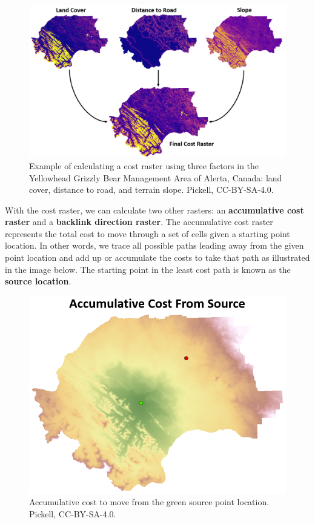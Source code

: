 \documentclass[
]{book}
\begin{document}
\begin{figure}
\includegraphics[width=0.75\linewidth]{images/08-calculating-cost-raster} \caption{Example of calculating a cost raster using three factors in the Yellowhead Grizzly Bear Management Area of Alerta, Canada: land cover, distance to road, and terrain slope. Pickell, CC-BY-SA-4.0.}\label{fig:8-calculating-cost-raster}
\end{figure}

With the cost raster, we can calculate two other rasters: an \textbf{accumulative cost raster} and a \textbf{backlink direction raster}. The accumulative cost raster represents the total cost to move through a set of cells given a starting point location. In other words, we trace all possible paths leading away from the given point location and add up or accumulate the costs to take that path as illustrated in the image below. The starting point in the least cost path is known as the \textbf{source location}.

\begin{figure}
\includegraphics[width=0.75\linewidth]{images/08-accumulative-cost-from-source} \caption{Accumulative cost to move from the green source point location. Pickell, CC-BY-SA-4.0.}\label{fig:8-accumulative-cost-from-source}
\end{figure}
\end{document}
